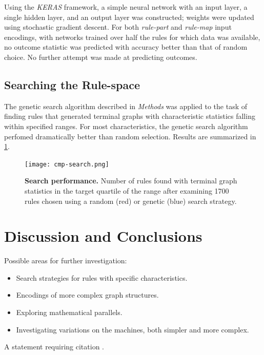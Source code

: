 \documentclass{tufte-handout}
\begin{document}
Using the \textit{KERAS} framework, a simple neural network with an input
layer, a single hidden layer, and an output layer was constructed; weights
were updated using stochastic gradient descent. For both \textit{rule-part} and
\textit{rule-map} input encodings, with networks trained over half the rules for
which data was available, no outcome statistic was predicted with accuracy
better than that of random choice. No further attempt was made at predicting
outcomes.

\subsection{Searching the Rule-space}

The genetic search algorithm described in \textit{Methods} was applied to
the task of finding rules that generated terminal graphs with characteristic
statistics falling within specified ranges. For most characteristics, the genetic
search algorithm perfomed dramatically better than random selection. Results
are summarized in \ref{fig:SearchPerformance}.

\begin{figure}
\texttt{[image: cmp-search.png]}
\caption{\textbf{Search performance.} Number of rules found with terminal
graph statistics in the target quartile of the range after examining
1700 rules chosen using a random (red) or genetic (blue) search strategy.}
\label{fig:SearchPerformance}
\end{figure}



\section{Discussion and Conclusions}

Possible areas for further investigation:

\begin{itemize}
    \item Search strategies for rules with specific characteristics.
    \item Encodings of more complex graph structures.
    \item Exploring mathematical parallels.
    \item Investigating variations on the machines, both simpler and more complex.
\end{itemize}

A statement requiring citation \cite{Figueredo:2009dg}.
\end{document}
